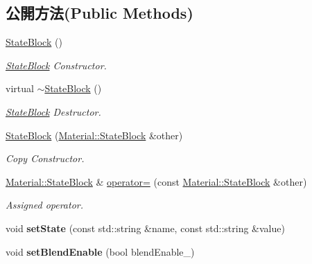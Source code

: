 \subsection*{公開方法(Public Methods)}
\begin{DoxyCompactItemize}
\item 
\hyperlink{class_i_dream_sky_1_1_material_1_1_state_block_aeeb8bcab6671808d46ad78b1dbb72cd1}{State\+Block} ()
\begin{DoxyCompactList}\small\item\em \hyperlink{class_i_dream_sky_1_1_material_1_1_state_block}{State\+Block} Constructor. \end{DoxyCompactList}\item 
virtual \hyperlink{class_i_dream_sky_1_1_material_1_1_state_block_ac28531650d7c81a4d7671dfdde4354c8}{$\sim$\+State\+Block} ()
\begin{DoxyCompactList}\small\item\em \hyperlink{class_i_dream_sky_1_1_material_1_1_state_block}{State\+Block} Destructor. \end{DoxyCompactList}\item 
\hyperlink{class_i_dream_sky_1_1_material_1_1_state_block_a5fa5631f46632acb9af1ae8b7fe358ad}{State\+Block} (\hyperlink{class_i_dream_sky_1_1_material_1_1_state_block}{Material\+::\+State\+Block} \&other)
\begin{DoxyCompactList}\small\item\em Copy Constructor. \end{DoxyCompactList}\item 
\hyperlink{class_i_dream_sky_1_1_material_1_1_state_block}{Material\+::\+State\+Block} \& \hyperlink{class_i_dream_sky_1_1_material_1_1_state_block_a19f6516728b90762ee945d288384b052}{operator=} (const \hyperlink{class_i_dream_sky_1_1_material_1_1_state_block}{Material\+::\+State\+Block} \&other)
\begin{DoxyCompactList}\small\item\em Assigned operator. \end{DoxyCompactList}\item 
void {\bfseries set\+State} (const std\+::string \&name, const std\+::string \&value)\hypertarget{class_i_dream_sky_1_1_material_1_1_state_block_a0f24e6fd11397d5246d5103725d2d0dc}{}\label{class_i_dream_sky_1_1_material_1_1_state_block_a0f24e6fd11397d5246d5103725d2d0dc}

\item 
void {\bfseries set\+Blend\+Enable} (bool blend\+Enable\+\_\+)\hypertarget{class_i_dream_sky_1_1_material_1_1_state_block_a9d01c7bfc3fc35c65658130e8ac4b5e9}{}\label{class_i_dream_sky_1_1_material_1_1_state_block_a9d01c7bfc3fc35c65658130e8ac4b5e9}


\end{DoxyCompactItemize}
